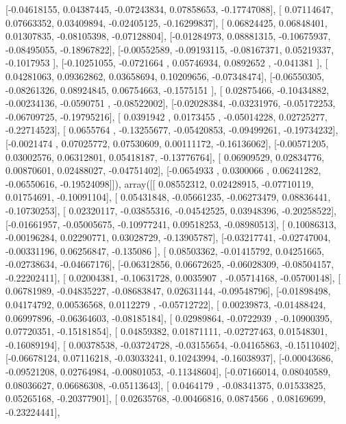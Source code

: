 \documentclass{article}
\begin{document}
       [-0.04618155,  0.04387445, -0.07243834,  0.07858653, -0.17747088],
       [ 0.07114647,  0.07663352,  0.03409894, -0.02405125, -0.16299837],
       [ 0.06824425,  0.06848401,  0.01307835, -0.08105398, -0.07128804],
       [-0.01284973,  0.08881315, -0.10675937, -0.08495055, -0.18967822],
       [-0.00552589, -0.09193115, -0.08167371,  0.05219337, -0.1017953 ],
       [-0.10251055, -0.0721664 ,  0.05746934,  0.0892652 , -0.041381  ],
       [ 0.04281063,  0.09362862,  0.03658694,  0.10209656, -0.07348474],
       [-0.06550305, -0.08261326,  0.08924845,  0.06754663, -0.1575151 ],
       [ 0.02875466, -0.10434882, -0.00234136, -0.0590751 , -0.08522002],
       [-0.02028384, -0.03231976, -0.05172253, -0.06709725, -0.19795216],
       [ 0.0391942 ,  0.0173455 , -0.05014228,  0.02725277, -0.22714523],
       [ 0.0655764 , -0.13255677, -0.05420853, -0.09499261, -0.19734232],
       [-0.0021474 ,  0.07025772,  0.07530609,  0.00111172, -0.16136062],
       [-0.00571205,  0.03002576,  0.06312801,  0.05418187, -0.13776764],
       [ 0.06909529,  0.02834776,  0.00870601,  0.02488027, -0.04751402],
       [-0.0654933 ,  0.0300066 ,  0.06241282, -0.06550616, -0.19524098]]), array([[ 0.08552312,  0.02428915, -0.07710119,  0.01754691, -0.10091104],
       [ 0.05431848, -0.05661235, -0.06273479,  0.08836441, -0.10730253],
       [ 0.02320117, -0.03855316, -0.04542525,  0.03948396, -0.20258522],
       [-0.01661957, -0.05005675, -0.10977241,  0.09518253, -0.08980513],
       [ 0.10086313, -0.00196284,  0.02290771,  0.03028729, -0.13905787],
       [-0.03217741, -0.02747004, -0.00331196,  0.06256847, -0.135086  ],
       [ 0.08503362, -0.01415792,  0.04251665, -0.02738634, -0.04667176],
       [-0.06312856,  0.06672625, -0.06028309, -0.08504157, -0.22202411],
       [ 0.02004381, -0.10631728,  0.0035907 , -0.05714168, -0.05700148],
       [ 0.06781989, -0.04835227, -0.08683847,  0.02631144, -0.09548796],
       [-0.01898498,  0.04174792,  0.00536568,  0.0112279 , -0.05712722],
       [ 0.00239873, -0.01488424,  0.06997896, -0.06364603, -0.08185184],
       [ 0.02989864, -0.0722939 , -0.10900395,  0.07720351, -0.15181854],
       [ 0.04859382,  0.01871111, -0.02727463,  0.01548301, -0.16089194],
       [ 0.00378538, -0.03724728, -0.03155654, -0.04165863, -0.15110402],
       [-0.06678124,  0.07116218, -0.03033241,  0.10243994, -0.16038937],
       [-0.00043686, -0.09521208,  0.02764984, -0.00801053, -0.11348604],
       [-0.07166014,  0.08040589,  0.08036627,  0.06686308, -0.05113643],
       [ 0.0464179 , -0.08341375,  0.01533825,  0.05265168, -0.20377901],
       [ 0.02635768, -0.00466816,  0.0874566 ,  0.08169699, -0.23224441],
\end{document}
